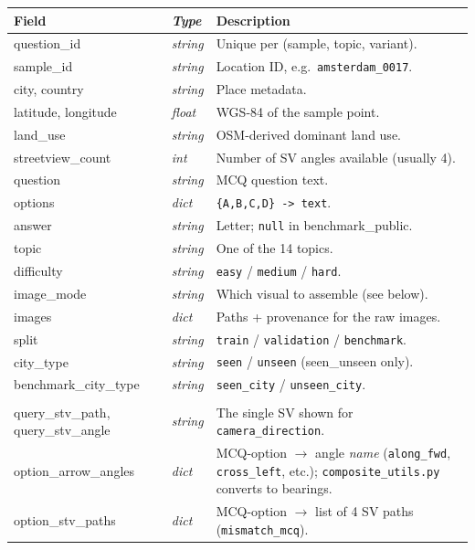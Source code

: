 \documentclass[11pt,a4paper]{article}
\begin{document}
\renewcommand{\arraystretch}{1.15}
\begin{tabularx}{\linewidth}{@{}>{\ttfamily\small}l>{\itshape\small}l X@{}}
\toprule
\textnormal{\textbf{Field}}      & \textbf{Type}   & \textbf{Description} \\
\midrule
question\_id      & string  & Unique per (sample, topic, variant). \\
sample\_id        & string  & Location ID, e.g.\ \texttt{amsterdam\_0017}. \\
city, country     & string  & Place metadata. \\
latitude, longitude & float & WGS-84 of the sample point. \\
land\_use         & string  & OSM-derived dominant land use. \\
streetview\_count & int     & Number of SV angles available (usually 4). \\
question          & string  & MCQ question text. \\
options           & dict    & \texttt{\{A,B,C,D\} -> text}. \\
answer            & string  & Letter; \texttt{null} in benchmark\_public. \\
topic             & string  & One of the 14 topics. \\
difficulty        & string  & \texttt{easy} / \texttt{medium} / \texttt{hard}. \\
image\_mode       & string  & Which visual to assemble (see below). \\
images            & dict    & Paths + provenance for the raw images. \\
split             & string  & \texttt{train} / \texttt{validation} / \texttt{benchmark}. \\
city\_type        & string  & \texttt{seen} / \texttt{unseen} (seen\_unseen only). \\
benchmark\_city\_type & string & \texttt{seen\_city} / \texttt{unseen\_city}. \\
\midrule
\multicolumn{3}{l}{\textit{Topic-specific fields:}} \\
query\_stv\_path, query\_stv\_angle  & string & The single SV shown for \texttt{camera\_direction}. \\
option\_arrow\_angles                & dict   & MCQ-option $\rightarrow$ angle \emph{name} (\texttt{along\_fwd}, \texttt{cross\_left}, etc.); \texttt{composite\_utils.py} converts to bearings. \\
option\_stv\_paths                   & dict   & MCQ-option $\rightarrow$ list of 4 SV paths (\texttt{mismatch\_mcq}). \\

\end{tabularx}
\end{document}
